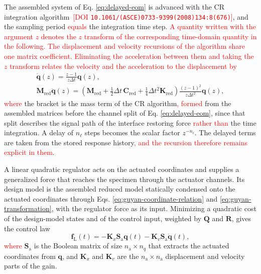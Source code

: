 \documentclass[11pt,a4paper]{article}
\numberwithin{equation}{section}
\newcommand{\rev}[1]{\textcolor{red}{#1}}
\begin{document}
The assembled system of Eq. \eqref{eq:delayed-eom} is advanced with the CR integration algorithm \cite{ChenRicles2008b}\,\rev{[DOI \nolinkurl{10.1061/(ASCE)0733-9399(2008)134:8(676)}]}, and the sampling period \rev{equals} the integration time step. \rev{A quantity written with the argument \(z\) denotes the \(z\) transform of the corresponding time-domain quantity in the following. The displacement and velocity recursions of the algorithm share one matrix coefficient. Eliminating the acceleration between them and taking the \(z\) transform relates the velocity and the acceleration to the displacement by}
\begin{equation}
	\begin{gathered}
		\dot{\bm{q}}(z)=\frac{z-1}{z\Delta t}\bm{q}(z),\\
		\mathbf{M}_{\mathrm{red}}\ddot{\bm{q}}(z)=
		\left(\mathbf{M}_{\mathrm{red}}
		+\tfrac{1}{2}\Delta t\,\mathbf{C}_{\mathrm{red}}
		+\tfrac{1}{4}\Delta t^{2}\mathbf{K}_{\mathrm{red}}\right)
		\frac{(z-1)^{2}}{z\Delta t^{2}}\bm{q}(z),
	\end{gathered}
	\label{eq:z-derivatives}
\end{equation}
\rev{where} the bracket is the mass term of the CR algorithm\rev{, formed} from the assembled matrices before the channel split of Eq. \eqref{eq:delayed-eom}, since that split describes the signal path of the interface restoring force \rev{rather than} the time integration. A delay of \(n_{\ell}\) steps becomes the scalar factor \(z^{-n_{\ell}}\). The delayed terms are taken from the stored response history\rev{, and the recursion therefore remains explicit in them}.

A linear quadratic regulator acts on the actuated coordinates and supplies a generalized force that reaches the specimen through the actuator channels. Its design model is the assembled reduced model statically condensed onto the actuated coordinates through Eqs. \eqref{eq:guyan-coordinate-relation} and \eqref{eq:guyan-transformation}, with the regulator force as its input. Minimizing a quadratic cost of the design-model states and of the control input, weighted by \(\mathbf{Q}\) and \(\mathbf{R}\), gives the control law
\begin{equation}
	\bm{f}_{\mathrm{L}}(t)=
	-\mathbf{K}_{x}\mathbf{S}_{\mathrm{a}}\bm{q}(t)
	-\mathbf{K}_{v}\mathbf{S}_{\mathrm{a}}\dot{\bm{q}}(t),
	\label{eq:lqr-law}
\end{equation}
\rev{where} \(\mathbf{S}_{\mathrm{a}}\) is the Boolean matrix of size \(n_{\mathrm{a}}\times n_{q}\) that extracts the actuated coordinates from \(\bm{q}\), and \(\mathbf{K}_{x}\) and \(\mathbf{K}_{v}\) are the \(n_{\mathrm{a}}\times n_{\mathrm{a}}\) displacement and velocity parts of the gain.
\end{document}
